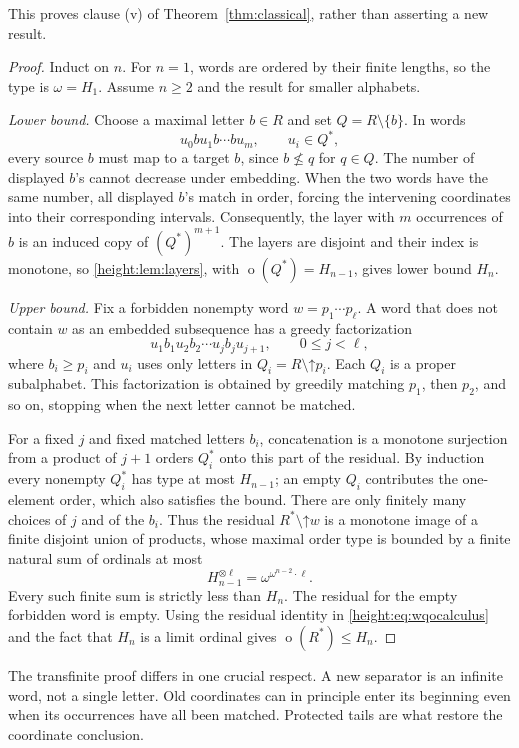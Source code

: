 \documentclass[11pt,a4paper]{article}
\numberwithin{equation}{section}
\theoremstyle{definition}
\theoremstyle{remark}
\newcommand{\mot}{\mathop{o}}
\newcommand{\up}{\mathord{\uparrow}}
\begin{document}
This proves clause (v) of Theorem~\ref{thm:classical}, rather than asserting a new result.

\begin{proof}
Induct on $n$. For $n=1$, words are ordered by their finite lengths, so
the type is $\omega=H_1$.
Assume $n\ge2$ and the result for smaller alphabets.

\emph{Lower bound.} Choose a maximal letter $b\in R$ and set
$Q=R\setminus\{b\}$. In words
\[
  u_0 b u_1 b\cdots b u_m,\qquad u_i\in Q^*,
\]
every source $b$ must map to a target $b$, since $b\not\le q$ for
$q\in Q$. The number of displayed $b$'s cannot decrease under embedding.
When the two words have the same number, all displayed $b$'s match in
order, forcing the intervening coordinates into their corresponding
intervals. Consequently, the layer with $m$ occurrences of $b$ is an
induced copy of $(Q^*)^{m+1}$. The layers are disjoint and their index is
monotone, so \cref{height:lem:layers}, with $\mot(Q^*)=H_{n-1}$, gives lower
bound $H_n$.

\emph{Upper bound.} Fix a forbidden nonempty word
$w=p_1\cdots p_\ell$. A word that does not contain $w$ as an embedded
subsequence has a greedy factorization
\[
  u_1 b_1 u_2 b_2\cdots u_j b_j u_{j+1},\qquad 0\le j<\ell,
\]
where $b_i\ge p_i$ and $u_i$ uses only letters in
$Q_i=R\setminus\up p_i$. Each $Q_i$ is a proper subalphabet.
This factorization is obtained by greedily matching $p_1$, then $p_2$,
and so on, stopping when the next letter cannot be matched.

For a fixed $j$ and fixed matched letters $b_i$, concatenation is a
monotone surjection from a product of $j+1$ orders $Q_i^*$ onto this
part of the residual. By induction every nonempty $Q_i^*$ has type at
most $H_{n-1}$; an empty $Q_i$ contributes the one-element order,
which also satisfies the bound. There are only finitely many choices
of $j$ and of the $b_i$. Thus the residual
$R^*\setminus\up w$ is a monotone image of a finite disjoint union of
products, whose maximal order type is bounded by a finite natural sum
of ordinals at most
\[
  H_{n-1}^{\otimes\ell}
  =\omega^{\omega^{n-2}\cdot\ell}.
\]
Every such finite sum is strictly less than $H_n$.
The residual for the empty forbidden word is empty.
Using the residual identity in \eqref{height:eq:wqocalculus} and the fact that
$H_n$ is a limit ordinal gives $\mot(R^*)\le H_n$.
\end{proof}

The transfinite proof differs in one crucial respect. A new separator
is an infinite word, not a single letter. Old coordinates can in
principle enter its beginning even when its occurrences have all been
matched. Protected tails are what restore the coordinate conclusion.
\end{document}
